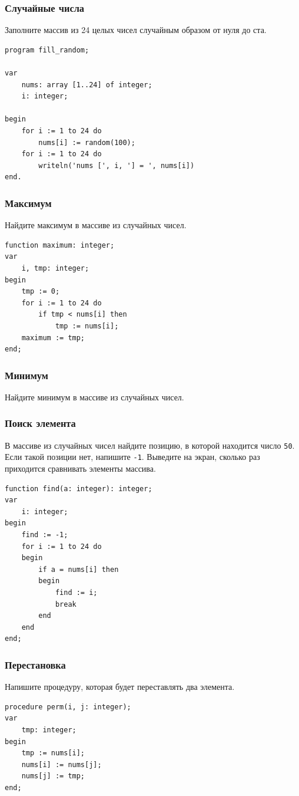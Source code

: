\documentclass[10,a4paper]{article}
\begin{document}
\subsubsection{Случайные числа}
Заполните массив из 24 целых чисел случайным образом от нуля до ста.
\begin{lstlisting}
program fill_random;

var
    nums: array [1..24] of integer;
    i: integer;

begin
    for i := 1 to 24 do
        nums[i] := random(100);
    for i := 1 to 24 do
        writeln('nums [', i, '] = ', nums[i])
end.
\end{lstlisting}
\subsubsection{Максимум}
Найдите максимум в массиве из случайных чисел.
\begin{lstlisting}
function maximum: integer;
var
    i, tmp: integer;
begin
    tmp := 0;
    for i := 1 to 24 do
        if tmp < nums[i] then
            tmp := nums[i];
    maximum := tmp;
end;
\end{lstlisting}
\subsubsection{Минимум}
Найдите минимум в массиве из случайных чисел.
\subsubsection{Поиск элемента}
В массиве из случайных чисел найдите позицию, в которой находится число
\texttt{50}. Если такой позиции нет, напишите \texttt{-1}. Выведите на
экран, сколько раз приходится сравнивать элементы массива.
\begin{lstlisting}
function find(a: integer): integer;
var
    i: integer;
begin
    find := -1;
    for i := 1 to 24 do
    begin
        if a = nums[i] then
        begin
            find := i;
            break
        end
    end 
end;
\end{lstlisting}
\subsubsection{Перестановка}
Напишите процедуру, которая будет переставлять два элемента.
\begin{lstlisting}
procedure perm(i, j: integer);
var
    tmp: integer;
begin
    tmp := nums[i];
    nums[i] := nums[j];
    nums[j] := tmp;
end;
\end{lstlisting}
\end{document}
